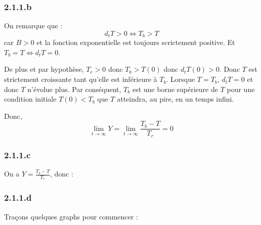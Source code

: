 \documentclass[10pt,a4paper,twocolumn]{article}
\begin{document}
\subsubsection{2.1.1.b}

On remarque que : $$ d_tT > 0 \Leftrightarrow T_b > T $$ car $B>0$ et la fonction exponentielle est toujours scrictement positive. Et $T_b = T \Leftrightarrow d_t T = 0$.

De plus et par hypothèse, $T_r > 0$ donc $T_b > T(0)$ donc $d_t T(0) > 0$. Donc $T$ est strictement croissante tant qu'elle est inférieure à $T_b$. Lorsque $T = T_b$, $d_t T = 0$ et donc $T$ n'évolue plus. Par conséquent, $T_b$ est une borne supérieure de $T$ pour une condition initiale $T(0) < T_b$ que $T$ atteindra, au pire, en un temps infini.

Donc, 
$$\lim_{t \rightarrow \infty} Y = \lim_{t \rightarrow \infty} \frac{T_b-T}{T_r} = 0 $$

\subsubsection{2.1.1.c}

On a $Y= \frac{T_b-T}{T_r}$, donc :


\subsubsection{2.1.1.d}

Traçons quelques graphs pour commencer : 

\end{document}
